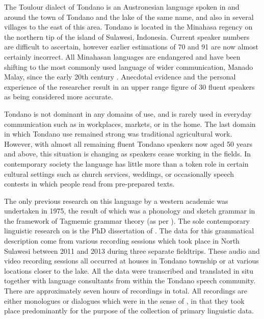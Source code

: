 \noindent The Toulour dialect of Tondano is an Austronesian language spoken in and around the town of Tondano and the lake of the same name, and also in several villages to the east of this area. Tondano is located in the Minahasa regency on the northern tip of the island of Sulawesi, Indonesia. Current speaker numbers are difficult to ascertain, however earlier estimations of 70  and 91  are now almost certainly incorrect. All Minahasan languages are endangered and have been shifting to the most commonly used language of wider communication, Manado Malay, since the early 20th century . Anecdotal evidence and the personal experience of the researcher result in an upper range figure of 30 fluent speakers as being considered more accurate.

Tondano is not dominant in any domains of use, and is rarely used in everyday communication such as in workplaces, markets, or in the home. The last domain in which Tondano use remained strong was traditional agricultural work. However, with almost all remaining fluent Tondano speakers now aged 50 years and above, this situation is changing as speakers cease working in the fields. In contemporary society the language has little more than a token role in certain cultural settings such as church services, weddings, or occasionally speech contests in which people read from pre-prepared texts.

The only previous research on this language by a western academic was undertaken in 1975, the result of which was a phonology and sketch grammar  in the framework of Tagmemic grammar theory (as per ). The sole contemporary linguistic research on is the PhD dissertation of . The data for this grammatical description come from various recording sessions which took place in North Sulawesi between 2011 and 2013 during three separate fieldtrips. These audio and video recording sessions all occurred at houses in Tondano township or at various locations closer to the lake. All the data were transcribed and translated in situ together with language consultants from within the Tondano speech community. There are approximately seven hours of recordings in total. All recordings are either monologues or dialogues which were  in the sense of , in that they took place predominantly for the purpose of the collection of primary linguistic data.

